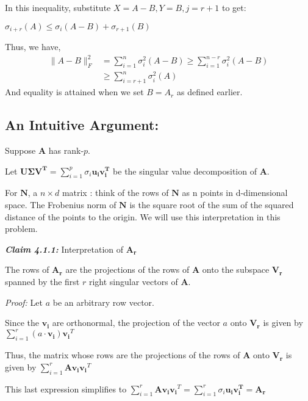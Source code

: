 \documentclass[fleqn, 11pt]{article}
\newcommand{\bs}[1]{\boldsymbol{#1}}
\begin{document}
In this inequality, substitute $X = A-B, Y = B, j = r+1$ to get:
\begin{center}
    $\sigma_{i+r}(A) \leq \sigma _{i}(A - B) + \sigma_{r+1}(B)$
\end{center}
Thus, we have,
    \begin{align*}
\|A - B\|_F^2 &= 
\sum_{i=1}^n \sigma_i^2(A - B) \geq 
\sum_{i=1}^{n-r} \sigma_i^2(A - B)
\\ & \geq \sum_{i=r+1}^{n} \sigma_i^2(A)
\end{align*}
And equality is attained when we set $B=A_r$ as defined earlier. 


\hrulefill

\subsection*{An Intuitive Argument: }


\medskip

Suppose $\bs{A}$ has rank-$p$.

Let $\bs{U \Sigma V^T}= \displaystyle \sum_{i=1}^{p} \sigma_i \bs{u_i v_i^T}  $ be the singular value decomposition of $\bs{A}$. 


For $\bs{N}$,  a $n \times d$ matrix : think of the rows of  $\bs{N}$ as n points in d-dimensional
space. The Frobenius norm of  $\bs{N}$ is the square root of the sum of the squared distance of
the points to the origin. We will use this interpretation in this problem. 

\newpage

{ \large  \textbf{\textit{Claim 4.1.1:}}} Interpretation of $\bs{A_r}$

\medskip

The rows of $\bs{A_r}$ are the projections of the rows of $\bs{A}$ onto the subspace $\bs{V_r}$
spanned by the first $r$ right singular vectors of $\bs{A}$. 


{\textit{Proof: }} Let $a$ be an arbitrary row vector.

Since the $\bs{v_i}$ are orthonormal, the projection of the vector $a$ onto $\bs{V_r}$ is given by 
$\displaystyle \sum_{i=1}^{r} (a \cdot \bs{v_i}) \bs{v_i}^T $

Thus, the matrix whose rows are the
projections of the rows of $\bs{A}$ onto $\bs{V_r}$  is given by 
$\displaystyle \sum_{i=1}^{r} \bs{A} \bs{v_i} \bs{v_i}^T $

This last expression simplifies to $\displaystyle \sum_{i=1}^{r} \bs{A} \bs{v_i} \bs{v_i}^T =  \displaystyle \sum_{i=1}^{r} \sigma_i \bs{u_i v_i^T} = \bs{A_r}  $
\end{document}
